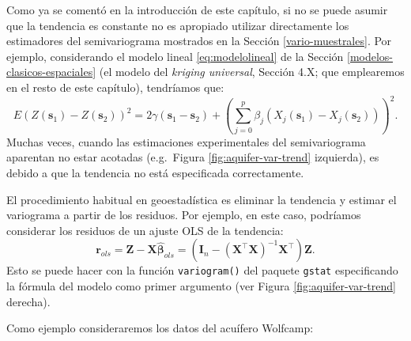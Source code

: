 \documentclass[
  spanish,
]{book}
\theoremstyle{break}
\theoremstyle{definition}
\theoremstyle{definition}
\theoremstyle{definition}
\theoremstyle{definition}
\theoremstyle{remark}
\begin{document}
Como ya se comentó en la introducción de este capítulo, si no se puede asumir que la tendencia es constante no es apropiado utilizar directamente los estimadores del semivariograma mostrados en la Sección \ref{vario-muestrales}.
Por ejemplo, considerando el modelo lineal \eqref{eq:modelolineal} de la Sección \ref{modelos-clasicos-espaciales} (el modelo del \emph{kriging universal}, Sección 4.X; que emplearemos en el resto de este capítulo), tendríamos que:
\[E(Z(\mathbf{s}_1)-Z(\mathbf{s}_{2}))^2 =2\gamma(\mathbf{s}_1
-\mathbf{s}_{2}) + \left( \sum\limits_{j=0}^{p}\beta_{j}  \left( X_{j}
(\mathbf{s}_1)-X_{j}(\mathbf{s}_{2})\right) \right)^2.\]
Muchas veces, cuando las estimaciones experimentales del semivariograma aparentan no estar acotadas (e.g.~Figura \ref{fig:aquifer-var-trend} izquierda), es debido a que la tendencia no está especificada correctamente.

El procedimiento habitual en geoestadística es eliminar la tendencia y estimar el variograma a partir de los residuos. Por ejemplo, en este caso, podríamos considerar los residuos de un ajuste OLS de la tendencia:
\[\mathbf{r}_{ols} =\mathbf{Z}-\mathbf{X}\hat{\boldsymbol{\beta}}_{ols} =\left( \mathbf{I}_{n}
- (\mathbf{X}^{\top}\mathbf{X})^{-1}\mathbf{X}^{\top} \right)\mathbf{Z}.\]
Esto se puede hacer con la función \texttt{variogram()} del paquete \texttt{gstat} especificando la fórmula del modelo como primer argumento (ver Figura \ref{fig:aquifer-var-trend} derecha).

Como ejemplo consideraremos los datos del acuífero Wolfcamp:
\end{document}
